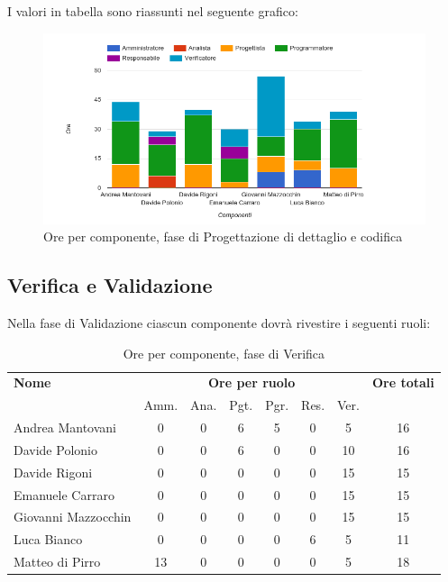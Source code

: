I valori in tabella sono riassunti nel seguente grafico: \\ 

    \begin{figure}[H]
      \begin{center}
        \includegraphics[width=12cm]{res/img/orePerComponenteProgettazioneDettaglioCodifica.png}
      \caption{Ore per componente, fase di Progettazione di dettaglio e codifica}
      \end{center} 
    \end{figure}    
    
    
    
\pagebreak
\subsection{Verifica e Validazione}
Nella fase di Validazione ciascun componente dovrà rivestire i seguenti ruoli:

\begin{table}[H]
\begin{tabular}{lccccccc}
\toprule
    \textbf{Nome}  & \multicolumn{6}{c}{\textbf{Ore per ruolo}} & \textbf{Ore totali} \\
     & Amm. & Ana. & Pgt. & Pgr. & Res. & Ver. & \\
    \midrule
    
	   Andrea Mantovani & 0 & 0 & 6 & 5 & 0 & 5 & 16 \\
	     Davide Polonio & 0 & 0 & 6 & 0 & 0 & 10 & 16 \\
	      Davide Rigoni & 0 & 0 & 0 & 0 & 0 & 15 & 15 \\
	   Emanuele Carraro & 0 & 0 & 0 & 0 & 0 & 15 & 15 \\
	Giovanni Mazzocchin & 0 & 0 & 0 & 0 & 0 & 15 & 15 \\
	        Luca Bianco & 0 & 0 & 0 & 0 & 6 & 5 & 11 \\
	    Matteo di Pirro & 13 & 0 & 0 & 0 & 0 & 5 & 18 \\
    
    \bottomrule
\end{tabular}
\caption{Ore per componente, fase di Verifica}
\end{table}

